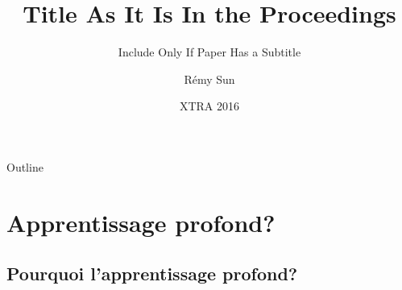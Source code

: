 \documentclass{beamer}
\title[Short Paper Title] %
{Title As It Is In the Proceedings}
\subtitle
{Include Only If Paper Has a Subtitle}
\author{Rémy Sun} %
\institute[ENS Rennes] %
{
  Département d'informatique\\
  ENS Rennes
}
\date[XTRA 2016] %
{XTRA 2016}
\begin{document}
\begin{frame}
  \titlepage
\end{frame}

\begin{frame}{Outline}
  \tableofcontents[pausesections]
\end{frame}





\section{Apprentissage profond?}

\subsection{Pourquoi l'apprentissage profond?}
\end{document}
